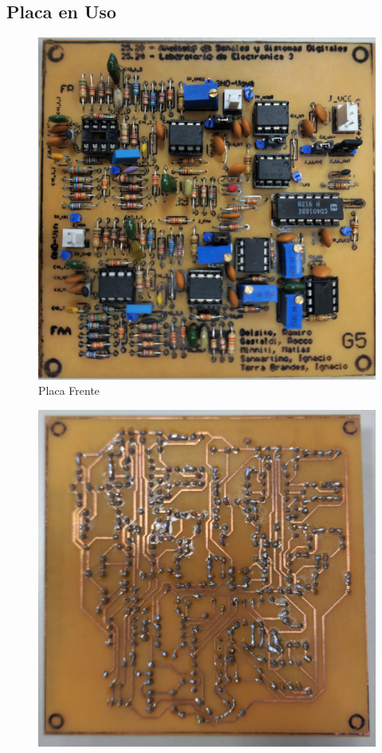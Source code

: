 \subsection{Placa en Uso}
\begin{figure}[H]
    \centering
    \begin{minipage}[b]{0.3\textwidth}
        \centering
        \includegraphics[width=\textwidth]{Imagenes/placaFrente.jpg}
        \\[2pt] {\small Placa Frente}
    \end{minipage}\hfill
    \begin{minipage}[b]{0.3\textwidth}
        \centering
        \includegraphics[width=\textwidth]{Imagenes/PlacaBottom.jpg}

\end{minipage}
\end{figure}
